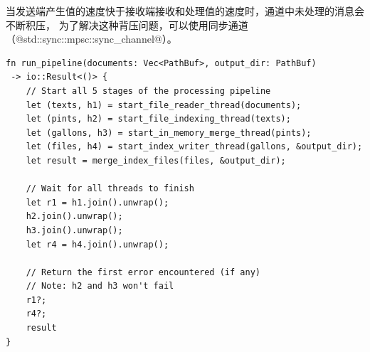 当发送端产生值的速度快于接收端接收和处理值的速度时，通道中未处理的消息会不断积压，
为了解决这种背压问题，可以使用同步通道（@std::sync::mpsc::sync_channel@）。

\begin{code}[title=pipeline]
\begin{verbatim}
fn run_pipeline(documents: Vec<PathBuf>, output_dir: PathBuf)
 -> io::Result<()> {
    // Start all 5 stages of the processing pipeline
    let (texts, h1) = start_file_reader_thread(documents);
    let (pints, h2) = start_file_indexing_thread(texts);
    let (gallons, h3) = start_in_memory_merge_thread(pints);
    let (files, h4) = start_index_writer_thread(gallons, &output_dir);
    let result = merge_index_files(files, &output_dir);

    // Wait for all threads to finish
    let r1 = h1.join().unwrap();
    h2.join().unwrap();
    h3.join().unwrap();
    let r4 = h4.join().unwrap();

    // Return the first error encountered (if any)
    // Note: h2 and h3 won't fail
    r1?;
    r4?;
    result
}
\end{verbatim}
\end{code}

